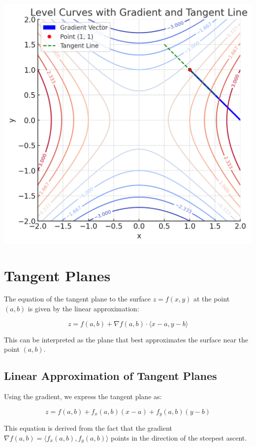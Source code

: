 \documentclass{report}
\begin{document}
\begin{center}
	\includegraphics[scale=0.5]{levelcurves.png}
\end{center}

\section{Tangent Planes}

The equation of the tangent plane to the surface $z = f(x, y)$ at the point $(a, b)$ is given by the linear approximation:

\[
	z = f(a, b) + \nabla f(a, b) \cdot \langle x - a, y - b \rangle
\]

This can be interpreted as the plane that best approximates the surface near the point $(a, b)$.

\subsection{Linear Approximation of Tangent Planes}

Using the gradient, we express the tangent plane as:

\[
	z = f(a, b) + f_x(a, b)(x - a) + f_y(a, b)(y - b)
\]

This equation is derived from the fact that the gradient $\nabla f(a, b) = \langle f_x(a, b), f_y(a, b) \rangle$ points in the direction of the steepest ascent.
\end{document}
